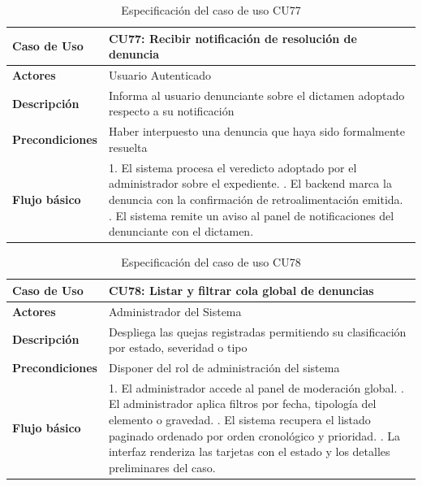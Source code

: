 \begin{table}[H]
\centering
\begin{tabular}{|p{3.2cm}|p{11.3cm}|}
\hline
\textbf{Caso de Uso} & \textbf{CU77: Recibir notificación de resolución de denuncia} \\ \hline
\textbf{Actores} & Usuario Autenticado \\ \hline
\textbf{Descripción} & Informa al usuario denunciante sobre el dictamen adoptado respecto a su notificación \\ \hline
\textbf{Precondiciones} & Haber interpuesto una denuncia que haya sido formalmente resuelta \\ \hline
\textbf{Flujo básico} & 
1. El sistema procesa el veredicto adoptado por el administrador sobre el expediente. \newline
2. El backend marca la denuncia con la confirmación de retroalimentación emitida. \newline
3. El sistema remite un aviso al panel de notificaciones del denunciante con el dictamen. \\ \hline
\end{tabular}
\caption{Especificación del caso de uso CU77}
\label{tab:cu77}
\end{table}

\begin{table}[H]
\centering
\begin{tabular}{|p{3.2cm}|p{11.3cm}|}
\hline
\textbf{Caso de Uso} & \textbf{CU78: Listar y filtrar cola global de denuncias} \\ \hline
\textbf{Actores} & Administrador del Sistema \\ \hline
\textbf{Descripción} & Despliega las quejas registradas permitiendo su clasificación por estado, severidad o tipo \\ \hline
\textbf{Precondiciones} & Disponer del rol de administración del sistema \\ \hline
\textbf{Flujo básico} & 
1. El administrador accede al panel de moderación global. \newline
2. El administrador aplica filtros por fecha, tipología del elemento o gravedad. \newline
3. El sistema recupera el listado paginado ordenado por orden cronológico y prioridad. \newline
4. La interfaz renderiza las tarjetas con el estado y los detalles preliminares del caso. \\ \hline
\end{tabular}
\caption{Especificación del caso de uso CU78}
\label{tab:cu78}
\end{table}


